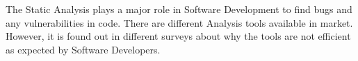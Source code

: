 The Static Analysis plays a major role in Software Development to find bugs and any vulnerabilities in code. There are different Analysis tools available in market. However, it is found out in different surveys about why the tools are not efficient as expected by Software Developers.